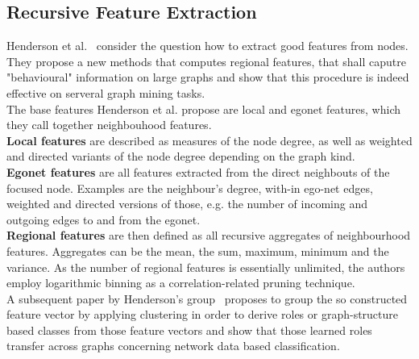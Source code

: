 \subsection{Recursive Feature Extraction}\label{\positionnumber}
Henderson et al.~\cite{henderson2011s} consider the question how to extract good features from nodes. They propose a new methods that computes regional features, that shall caputre "behavioural" information on large graphs and show that this procedure is indeed effective on serveral graph mining tasks. \\
The base features Henderson et al. propose are local and egonet features, which they call together neighbouhood features. \\
\textbf{Local features} are described as measures of the node degree, as well as weighted and directed variants of the node degree depending on the graph kind. \\
\textbf{Egonet features} are all features extracted from the direct neighbouts of the focused node. Examples are the neighbour's degree, with-in ego-net edges, weighted and directed versions of those, e.g. the number of incoming and outgoing edges to and from the egonet. \\
\textbf{Regional features} are then defined as all recursive aggregates of neighbourhood features. Aggregates can be the mean, the sum, maximum, minimum and the variance. As the number of regional features is essentially unlimited, the authors employ logarithmic binning as a correlation-related pruning technique. \\
A subsequent paper by Henderson's group~\cite{henderson2012rolx} proposes to group the so constructed feature vector by applying clustering in order to derive roles or graph-structure based classes from those feature vectors and show that those learned roles transfer across graphs concerning network data based classification. \\
